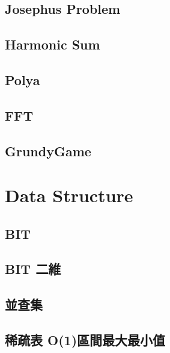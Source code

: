 \subsection{Josephus Problem}


\subsection{Harmonic Sum}


\subsection{Polya}


\subsection{FFT}


\subsection{GrundyGame}


\section{Data Structure}

\subsection{BIT}


\subsection{BIT 二維}


\subsection{並查集}


\subsection{稀疏表 O(1)區間最大最小值}


